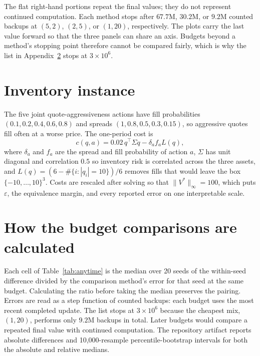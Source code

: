 \documentclass{article}
\begin{document}
The flat right-hand portions repeat the final values; they do not represent
continued computation.  Each method stops after $67.7$M, $30.2$M, or $9.2$M
counted backups at $(5,2)$, $(2,5)$, or $(1,20)$, respectively.  The plots
carry the last value forward so that the three panels can share an axis.
Budgets beyond a method's stopping point therefore cannot be compared fairly,
which is why the list in
Appendix~\ref{app:anytime} stops at $3\times10^6$.

\section{Inventory instance}
\label{app:mdp}

The five joint quote-aggressiveness actions have fill probabilities
$(0.1,0.2,0.4,0.6,0.8)$ and spreads $(1,0.8,0.5,0.3,0.15)$, so aggressive quotes fill
often at a worse price.  The one-period cost is
\begin{equation*}
 c(q,a)=0.02\,q^\top\Sigma q-\delta_a f_a L(q),
\end{equation*}
where $\delta_a$ and $f_a$ are the spread and fill probability of action $a$,
$\Sigma$ has unit diagonal and correlation $0.5$ so inventory risk is
correlated across the three assets, and
$L(q)=(6-\#\{i:|q_i|=10\})/6$ removes fills that would leave the box
$\{-10,\ldots,10\}^3$.  Costs are rescaled after solving so that
$\lVert V^*\rVert_\infty=100$, which puts $\varepsilon$, the equivalence
margin, and every reported error on one interpretable scale.

\section{How the budget comparisons are calculated}
\label{app:anytime}

Each cell of Table~\ref{tab:anytime} is the median over 20 seeds of the
within-seed difference divided by the comparison method's error for that seed
at the same budget.  Calculating the ratio before taking the median preserves
the pairing.  Errors are read as a step function of
counted backups: each budget uses the most recent completed update.  The list
stops at $3\times10^6$ because the cheapest mix, $(1,20)$, performs only $9.2$M
backups in total.  Later budgets would compare a repeated final value with
continued computation.  The repository artifact reports absolute differences
and 10,000-resample percentile-bootstrap intervals for both the absolute and
relative medians.
\end{document}
